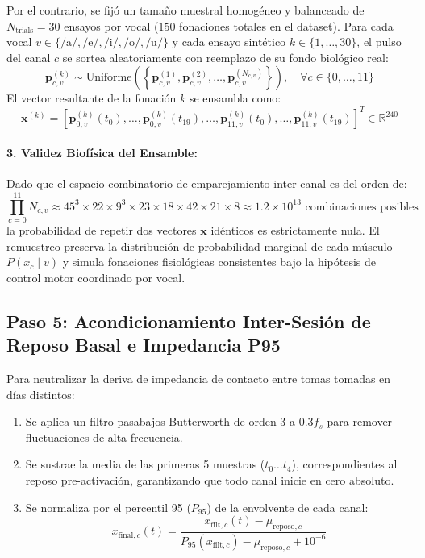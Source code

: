 \documentclass[11pt,a4paper,openany]{book}
\theoremstyle{definition}
\begin{document}
Por el contrario, se fijó un tamaño muestral homogéneo y balanceado de $N_{\text{trials}} = 30$ ensayos por vocal ($150$ fonaciones totales en el dataset). Para cada vocal $v \in \{\text{/a/}, \text{/e/}, \text{/i/}, \text{/o/}, \text{/u/}\}$ y cada ensayo sintético $k \in \{1, \dots, 30\}$, el pulso del canal $c$ se sortea aleatoriamente con reemplazo de su fondo biológico real:
\begin{equation}
\mathbf{p}_{c, v}^{(k)} \sim \text{Uniforme}\left( \left\{ \mathbf{p}_{c, v}^{(1)}, \mathbf{p}_{c, v}^{(2)}, \dots, \mathbf{p}_{c, v}^{(N_{c, v})} \right\} \right), \quad \forall c \in \{0, \dots, 11\}
\end{equation}
El vector resultante de la fonación $k$ se ensambla como:
\begin{equation}
\mathbf{x}^{(k)} = \left[ \mathbf{p}_{0, v}^{(k)}(t_0), \dots, \mathbf{p}_{0, v}^{(k)}(t_{19}), \dots, \mathbf{p}_{11, v}^{(k)}(t_0), \dots, \mathbf{p}_{11, v}^{(k)}(t_{19}) \right]^T \in \mathbb{R}^{240}
\end{equation}

\paragraph{3. Validez Biofísica del Ensamble:}
Dado que el espacio combinatorio de emparejamiento inter-canal es del orden de:
\begin{equation}
\prod_{c=0}^{11} N_{c, v} \approx 45^3 \times 22 \times 9^3 \times 23 \times 18 \times 42 \times 21 \times 8 \approx 1.2 \times 10^{13} \text{ combinaciones posibles}
\end{equation}
la probabilidad de repetir dos vectores $\mathbf{x}$ idénticos es estrictamente nula. El remuestreo preserva la distribución de probabilidad marginal de cada músculo $P(x_c \mid v)$ y simula fonaciones fisiológicas consistentes bajo la hipótesis de control motor coordinado por vocal.

\subsection{Paso 5: Acondicionamiento Inter-Sesión de Reposo Basal e Impedancia P95}
Para neutralizar la deriva de impedancia de contacto entre tomas tomadas en días distintos:
\begin{enumerate}
    \item Se aplica un filtro pasabajos Butterworth de orden 3 a $0.3 f_s$ para remover fluctuaciones de alta frecuencia.
    \item Se sustrae la media de las primeras 5 muestras ($t_0 \dots t_4$), correspondientes al reposo pre-activación, garantizando que todo canal inicie en cero absoluto.
    \item Se normaliza por el percentil 95 ($P_{95}$) de la envolvente de cada canal:
    \begin{equation}
    x_{\text{final}, c}(t) = \frac{x_{\text{filt}, c}(t) - \mu_{\text{reposo}, c}}{P_{95}(x_{\text{filt}, c}) - \mu_{\text{reposo}, c} + 10^{-6}}
    \end{equation}
\end{enumerate}
\end{document}
